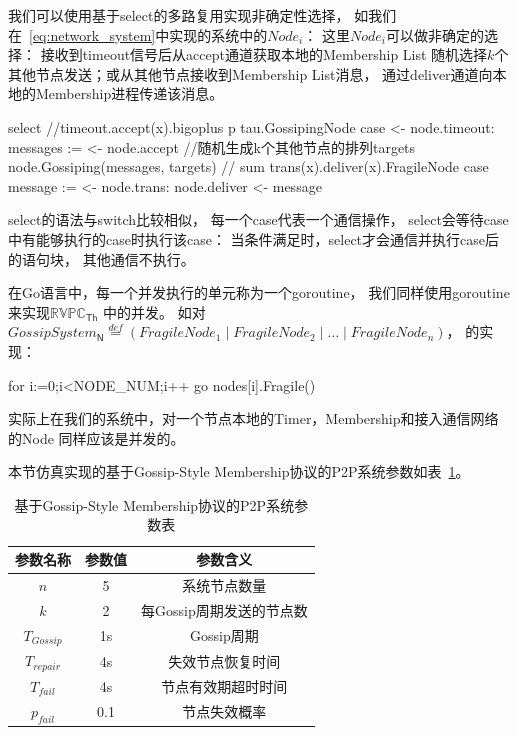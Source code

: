 我们可以使用基于select的多路复用实现非确定性选择，
如我们在~\ref{eq:network_system}中实现的系统中的$Node_i$：
这里$Node_i$可以做非确定的选择：
接收到timeout信号后从accept通道获取本地的Membership List
随机选择$k$个其他节点发送；或从其他节点接收到Membership List消息，
通过deliver通道向本地的Membership进程传递该消息。

\begin{codeblock}[language=GO]
   select {
      //timeout.accept(x).bigoplus p tau.GossipingNode
      case <- node.timeout:
         messages := <- node.accept
         //随机生成k个其他节点的排列targets
         node.Gossiping(messages, targets)
      // sum trans(x).deliver(x).FragileNode
      case message := <- node.trans:
         node.deliver <- message
	}
\end{codeblock}
select的语法与switch比较相似，
每一个case代表一个通信操作，
select会等待case中有能够执行的case时执行该case：
当条件满足时，select才会通信并执行case后的语句块，
其他通信不执行。

在Go语言中，每一个并发执行的单元称为一个goroutine，
我们同样使用goroutine来实现$\mathbb{RVPC}_{\mathsf{Th}}$
中的并发。
如对$GossipSystem_\mathsf{N}\stackrel{def}{=}(FragileNode_1\mid FragileNode_2\mid \dots \mid FragileNode_n)$，
的实现：
\begin{codeblock}[language=GO]
   for i:=0;i<NODE_NUM;i++ {
        go nodes[i].Fragile()
    }
\end{codeblock}
实际上在我们的系统中，对一个节点本地的Timer，Membership和接入通信网络的Node
同样应该是并发的。

本节仿真实现的基于Gossip-Style Membership协议的P2P系统参数如表~\ref{tab:param}。
\begin{table}[!hpt]
   \caption{基于Gossip-Style Membership协议的P2P系统参数表}
   \label{tab:param}
   \centering
   \begin{tabular}{@{}ccc@{}} \toprule
     参数名称 & 参数值 & 参数含义 \\ \midrule
     $n$ & 5 & 系统节点数量\\
     $k$ & 2 & 每Gossip周期发送的节点数\\
     $T_{Gossip}$ & 1s & Gossip周期\\
     $T_{repair}$ & 4s & 失效节点恢复时间\\
     $T_{fail}$ & 4s & 节点有效期超时时间\\
     $p_{fail}$ & 0.1 & 节点失效概率\\ \bottomrule
   \end{tabular}
 \end{table}

